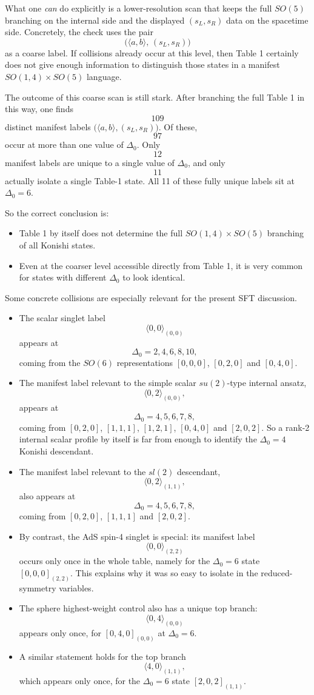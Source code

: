 \documentclass[12pt]{article}
\def\be{\begin{equation}}
\def\ee{\end{equation}}
\newcommand{\D}{\ensuremath{\Delta}}
\begin{document}
What one \emph{can} do explicitly is a lower-resolution scan that keeps the full $SO(5)$ branching
on the internal side and the displayed $(s_L,s_R)$ data on the spacetime side. Concretely, the check
uses the pair
\be
\big(\langle a,b\rangle,\,(s_L,s_R)\big)
\ee
as a coarse label. If collisions already occur at this level, then Table 1 certainly does not give
enough information to distinguish those states in a manifest $SO(1,4)\times SO(5)$ language.

The outcome of this coarse scan is still stark. After branching the full Table 1 in this way, one finds
\be
109
\ee
distinct manifest labels $\big(\langle a,b\rangle,(s_L,s_R)\big)$.
Of these,
\be
97
\ee
occur at more than one value of $\D_0$.
Only
\be
12
\ee
manifest labels are unique to a single value of $\D_0$, and only
\be
11
\ee
actually isolate a single Table-1 state. All 11 of these fully unique labels sit at $\D_0=6$.

So the correct conclusion is:
\begin{itemize}
\item Table 1 by itself does not determine the full $SO(1,4)\times SO(5)$ branching of all Konishi states.
\item Even at the coarser level accessible directly from Table 1, it is very common for states with different
$\D_0$ to look identical.
\end{itemize}

Some concrete collisions are especially relevant for the present SFT discussion.
\begin{itemize}
\item The scalar singlet label
\be
\langle 0,0\rangle_{(0,0)}
\ee
appears at
\be
\D_0=2,4,6,8,10,
\ee
coming from the $SO(6)$ representations $[0,0,0]$, $[0,2,0]$ and $[0,4,0]$.
\item The manifest label relevant to the simple scalar $su(2)$-type internal ansatz,
\be
\langle 0,2\rangle_{(0,0)},
\ee
appears at
\be
\D_0=4,5,6,7,8,
\ee
coming from $[0,2,0]$, $[1,1,1]$, $[1,2,1]$, $[0,4,0]$ and $[2,0,2]$.
So a rank-2 internal scalar profile by itself is far from enough to identify the $\D_0=4$ Konishi
descendant.
\item The manifest label relevant to the $sl(2)$ descendant,
\be
\langle 0,2\rangle_{(1,1)},
\ee
also appears at
\be
\D_0=4,5,6,7,8,
\ee
coming from $[0,2,0]$, $[1,1,1]$ and $[2,0,2]$.
\item By contrast, the AdS spin-4 singlet is special: its manifest label
\be
\langle 0,0\rangle_{(2,2)}
\ee
occurs only once in the whole table, namely for the $\D_0=6$ state $[0,0,0]_{(2,2)}$.
This explains why it was so easy to isolate in the reduced-symmetry variables.
\item The sphere highest-weight control also has a unique top branch:
\be
\langle 0,4\rangle_{(0,0)}
\ee
appears only once, for $[0,4,0]_{(0,0)}$ at $\D_0=6$.
\item A similar statement holds for the top branch
\be
\langle 4,0\rangle_{(1,1)},
\ee
which appears only once, for the $\D_0=6$ state $[2,0,2]_{(1,1)}$.
\end{itemize}
\end{document}

